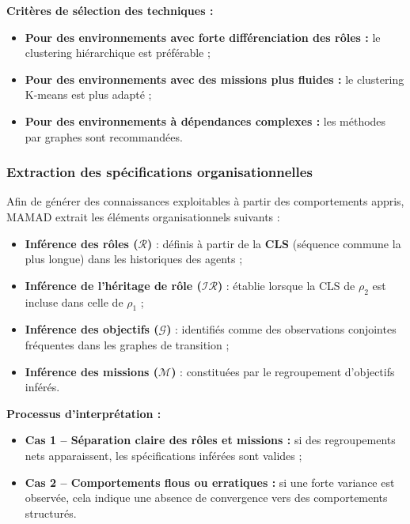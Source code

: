 \documentclass[pdflatex,sn-mathphys-num]{sn-jnl}%
\theoremstyle{thmstyleone}%
\theoremstyle{thmstyletwo}%
\theoremstyle{thmstylethree}%
\begin{document}
\vspace{0.4em}
\noindent \textbf{Critères de sélection des techniques :}
\begin{itemize}
    \item \textbf{Pour des environnements avec forte différenciation des rôles :} le clustering hiérarchique est préférable ;
    \item \textbf{Pour des environnements avec des missions plus fluides :} le clustering K-means est plus adapté ;
    \item \textbf{Pour des environnements à dépendances complexes :} les méthodes par graphes sont recommandées.
\end{itemize}

\subsubsection{Extraction des spécifications organisationnelles}

Afin de générer des connaissances exploitables à partir des comportements appris, MAMAD extrait les éléments organisationnels suivants :

\begin{itemize}
    \item \textbf{Inférence des rôles ($\mathcal{R}$)} : définis à partir de la \textbf{CLS} (séquence commune la plus longue) dans les historiques des agents ;
    \item \textbf{Inférence de l'héritage de rôle ($\mathcal{IR}$)} : établie lorsque la CLS de $\rho_2$ est incluse dans celle de $\rho_1$ ;
    \item \textbf{Inférence des objectifs ($\mathcal{G}$)} : identifiés comme des observations conjointes fréquentes dans les graphes de transition ;
    \item \textbf{Inférence des missions ($\mathcal{M}$)} : constituées par le regroupement d'objectifs inférés.
\end{itemize}

\vspace{0.4em}
\noindent \textbf{Processus d'interprétation :}
\begin{itemize}
    \item \textbf{Cas 1 – Séparation claire des rôles et missions :} si des regroupements nets apparaissent, les spécifications inférées sont valides ;
    \item \textbf{Cas 2 – Comportements flous ou erratiques :} si une forte variance est observée, cela indique une absence de convergence vers des comportements structurés.
\end{itemize}
\end{document}
